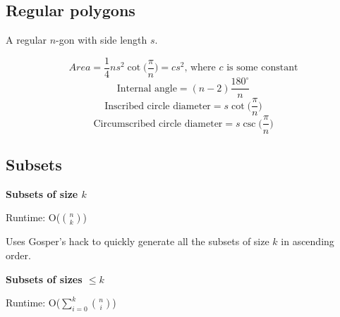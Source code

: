 \subsection*{Regular polygons}

A regular $n$-gon with side length $s$.

$$Area = \frac{1}{4}ns^2 \cot \Big(\frac{\pi}{n} \Big) = cs^2 \text{, where } c \text{ is some constant}$$
$$\text{Internal angle} = (n-2) \frac{180^\circ}{n}$$
$$\text{Inscribed circle diameter} = s \cot \Big( \frac{\pi}{n} \Big)$$
$$\text{Circumscribed circle diameter} = s \csc \Big( \frac{\pi}{n} \Big)$$

\subsection*{Subsets}

\textbf{Subsets of size $k$}

Runtime: O($\binom{n}{k}$)

Uses Gosper's hack to quickly generate all the subsets of size $k$ in ascending order.



\textbf{Subsets of sizes $\leq k$}

Runtime: O($\sum_{i=0}^k \binom{n}{i}$)




\newpage